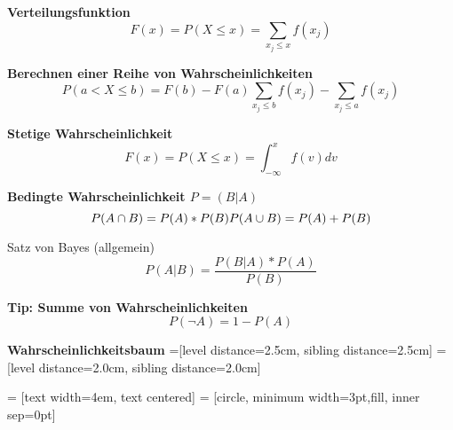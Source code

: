 \documentclass[11pt,twocolumn,fleqn]{article}
\begin{document}
\textbf{Verteilungsfunktion}
\begin{equation*}
F(x)=P(X \leq x)=\sum_{x_j \leq x }f(x_j)
\end{equation*}

\textbf{Berechnen einer Reihe von Wahrscheinlichkeiten}
\begin{equation*}
P(a<X \leq b) = F(b)-F(a) \sum_{x_j \leq b }f(x_j) - \sum_{x_j \leq a }f(x_j)
\end{equation*}

\textbf{Stetige Wahrscheinlichkeit}
\begin{equation*}
F(x) = P(X \leq x) = \int^x_{-\infty} f(v)dv
\end{equation*}

\textbf{Bedingte Wahrscheinlichkeit $P=(B|A)$}
\begin{equation*}
P(A \cap B) = P(A) * P(B)\\
P(A \cup B) = P(A) + P(B)
\end{equation*}

Satz von Bayes (allgemein)
\begin{equation*}
P(A|B) = \frac{ P(B|A) * P(A) }{ P(B) }
\end{equation*}



\textbf{Tip: Summe von Wahrscheinlichkeiten}
\begin{equation*}
P(\neg A) = 1 - P(A)
\end{equation*}

\textbf{Wahrscheinlichkeitsbaum}
=[level distance=2.5cm, sibling distance=2.5cm]
=[level distance=2.0cm, sibling distance=2.0cm]

 = [text width=4em, text centered]
 = [circle, minimum width=3pt,fill, inner sep=0pt]
\end{document}
